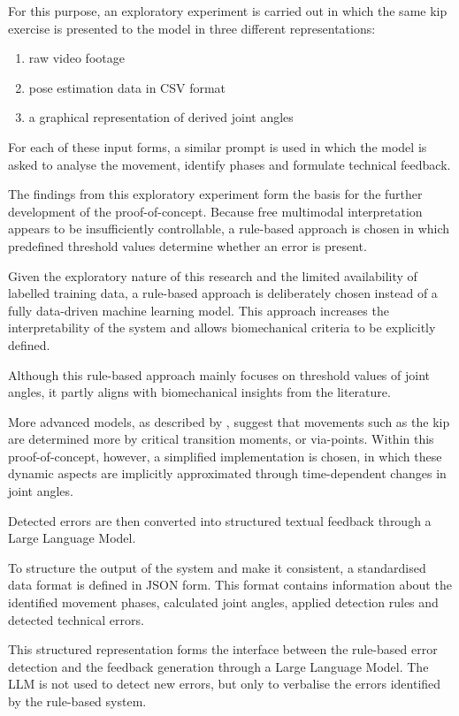 For this purpose, an exploratory experiment is carried out in which the same kip exercise is presented to the model in three different representations:

\begin{enumerate}
    \item raw video footage
    \item pose estimation data in CSV format
    \item a graphical representation of derived joint angles
\end{enumerate}

For each of these input forms, a similar prompt is used in which the model is asked to analyse the movement, identify phases and formulate technical feedback.

The findings from this exploratory experiment form the basis for the further development of the proof-of-concept. Because free multimodal interpretation appears to be insufficiently controllable, a rule-based approach is chosen in which predefined threshold values determine whether an error is present.

Given the exploratory nature of this research and the limited availability of labelled training data, a rule-based approach is deliberately chosen instead of a fully data-driven machine learning model. This approach increases the interpretability of the system and allows biomechanical criteria to be explicitly defined.

Although this rule-based approach mainly focuses on threshold values of joint angles, it partly aligns with biomechanical insights from the literature.

More advanced models, as described by \textcite{Yamasaki2010}, suggest that movements such as the kip are determined more by critical transition moments, or via-points. Within this proof-of-concept, however, a simplified implementation is chosen, in which these dynamic aspects are implicitly approximated through time-dependent changes in joint angles.

Detected errors are then converted into structured textual feedback through a Large Language Model.

To structure the output of the system and make it consistent, a standardised data format is defined in JSON form. This format contains information about the identified movement phases, calculated joint angles, applied detection rules and detected technical errors.

This structured representation forms the interface between the rule-based error detection and the feedback generation through a Large Language Model. The LLM is not used to detect new errors, but only to verbalise the errors identified by the rule-based system.

